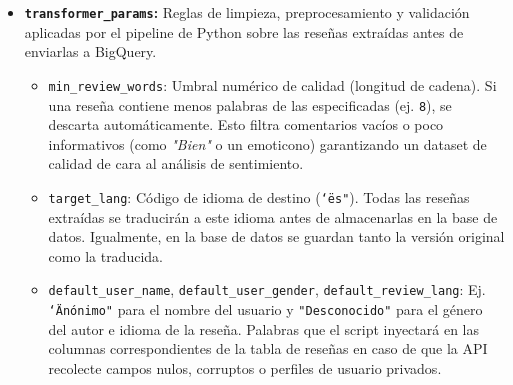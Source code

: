 \begin{itemize}
    \item \textbf{\texttt{transformer\_params}:}
    Reglas de limpieza, preprocesamiento y validación aplicadas por el pipeline de Python sobre las reseñas extraídas antes de enviarlas a BigQuery.
    \begin{itemize}
        \item \texttt{min\_review\_words}: Umbral numérico de calidad (longitud de cadena). Si una reseña contiene menos palabras de las especificadas (ej. \texttt{8}), se descarta automáticamente. Esto filtra comentarios vacíos o poco informativos (como \textit{"Bien"} o un emoticono) garantizando un dataset de calidad de cara al análisis de sentimiento.
        \item \texttt{target\_lang}: Código de idioma de destino (\texttt{\char`\"es"}). Todas las reseñas extraídas se traducirán a este idioma antes de almacenarlas en la base de datos. Igualmente, en la base de datos se guardan tanto la versión original como la traducida.
        \item \texttt{default\_user\_name}, \texttt{default\_user\_gender}, \texttt{default\_review\-\_lang}: Ej. \texttt{\char`\"Anónimo"} para el nombre del usuario y \texttt{"Desconocido"} para el género del autor e idioma de la reseña. Palabras que el script inyectará en las columnas correspondientes de la tabla de reseñas en caso de que la API recolecte campos nulos, corruptos o perfiles de usuario privados.
    \end{itemize}


\end{itemize}
